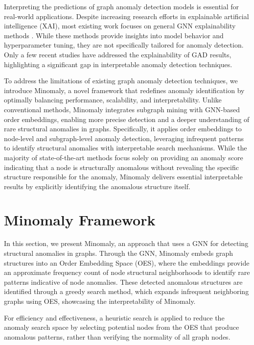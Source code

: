 \documentclass[pdflatex,sn-mathphys-num]{sn-jnl}%
\theoremstyle{thmstyleone}%
\theoremstyle{thmstyletwo}%
\theoremstyle{thmstylethree}%
\begin{document}
Interpreting the predictions of graph anomaly detection models is essential for real-world applications. Despite increasing research efforts in explainable artificial intelligence (XAI), most existing work focuses on general GNN explainability methods \cite{jaykumar2023explain,wu2022trustworthy,ying2019gnnexplainer}. While these methods provide insights into model behavior and hyperparameter tuning, they are not specifically tailored for anomaly detection. Only a few recent studies \cite{YANG2024106463,liu2023towards,neuro2023explain,sun2020graph,shneiderman2020bridging,mansouri2023cosp} have addressed the explainability of GAD results, highlighting a significant gap in interpretable anomaly detection techniques.

To address the limitations of existing graph anomaly detection techniques, we introduce Minomaly, a novel framework that redefines anomaly identification by optimally balancing performance, scalability, and interpretability. Unlike conventional methods, Minomaly integrates subgraph mining with GNN-based order embeddings, enabling more precise detection and a deeper understanding of rare structural anomalies in graphs. Specifically, it applies order embeddings to node-level and subgraph-level anomaly detection, leveraging infrequent patterns to identify structural anomalies with interpretable search mechanisms. While the majority of state-of-the-art methods focus solely on providing an anomaly score indicating that a node is structurally anomalous without revealing the specific structure responsible for the anomaly, Minomaly delivers essential interpretable results by explicitly identifying the anomalous structure itself.

\section{Minomaly Framework}
\label{sec:framework}
In this section, we present Minomaly, an approach that uses a GNN for detecting structural anomalies in graphs. Through the GNN, Minomaly embeds graph structures into an Order Embedding Space (OES), where the embeddings provide an approximate frequency count of node structural neighborhoods to identify rare patterns indicative of node anomalies. These detected anomalous structures are identified through a greedy search method, which expands infrequent neighboring graphs using OES, showcasing the interpretability of Minomaly.

For efficiency and effectiveness, a heuristic search is applied to reduce the anomaly search space by selecting potential nodes from the OES that produce anomalous patterns, rather than verifying the normality of all graph nodes.
\end{document}

